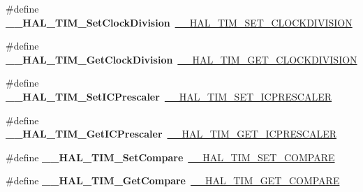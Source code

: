 \begin{DoxyCompactItemize}
\item 
\#define {\bfseries \+\_\+\+\_\+\+H\+A\+L\+\_\+\+T\+I\+M\+\_\+\+Set\+Clock\+Division}~\hyperlink{group___t_i_m___exported___macros_ga8aa84d77c670890408092630f9b2bdc4}{\+\_\+\+\_\+\+H\+A\+L\+\_\+\+T\+I\+M\+\_\+\+S\+E\+T\+\_\+\+C\+L\+O\+C\+K\+D\+I\+V\+I\+S\+I\+ON}\hypertarget{group___h_a_l___t_i_m___aliased___macros_ga8b8f3cf144c4058ec55e6e3659c6a68f}{}\label{group___h_a_l___t_i_m___aliased___macros_ga8b8f3cf144c4058ec55e6e3659c6a68f}

\item 
\#define {\bfseries \+\_\+\+\_\+\+H\+A\+L\+\_\+\+T\+I\+M\+\_\+\+Get\+Clock\+Division}~\hyperlink{group___t_i_m___exported___macros_gae6bc91bb5940bce52828c690f24001b8}{\+\_\+\+\_\+\+H\+A\+L\+\_\+\+T\+I\+M\+\_\+\+G\+E\+T\+\_\+\+C\+L\+O\+C\+K\+D\+I\+V\+I\+S\+I\+ON}\hypertarget{group___h_a_l___t_i_m___aliased___macros_gaaf835e3864f2ba2e2026d417ad0d5e40}{}\label{group___h_a_l___t_i_m___aliased___macros_gaaf835e3864f2ba2e2026d417ad0d5e40}

\item 
\#define {\bfseries \+\_\+\+\_\+\+H\+A\+L\+\_\+\+T\+I\+M\+\_\+\+Set\+I\+C\+Prescaler}~\hyperlink{group___t_i_m___exported___macros_gaeb106399b95ef02cec502f58276a0e92}{\+\_\+\+\_\+\+H\+A\+L\+\_\+\+T\+I\+M\+\_\+\+S\+E\+T\+\_\+\+I\+C\+P\+R\+E\+S\+C\+A\+L\+ER}\hypertarget{group___h_a_l___t_i_m___aliased___macros_ga1cb3c9854441539ebe076fba62c36d22}{}\label{group___h_a_l___t_i_m___aliased___macros_ga1cb3c9854441539ebe076fba62c36d22}

\item 
\#define {\bfseries \+\_\+\+\_\+\+H\+A\+L\+\_\+\+T\+I\+M\+\_\+\+Get\+I\+C\+Prescaler}~\hyperlink{group___t_i_m___exported___macros_gabfeec6b3c67a5747c7dbd20aff61d8e2}{\+\_\+\+\_\+\+H\+A\+L\+\_\+\+T\+I\+M\+\_\+\+G\+E\+T\+\_\+\+I\+C\+P\+R\+E\+S\+C\+A\+L\+ER}\hypertarget{group___h_a_l___t_i_m___aliased___macros_gae8d82e4e04e81f7a023a45b73c9705b7}{}\label{group___h_a_l___t_i_m___aliased___macros_gae8d82e4e04e81f7a023a45b73c9705b7}

\item 
\#define {\bfseries \+\_\+\+\_\+\+H\+A\+L\+\_\+\+T\+I\+M\+\_\+\+Set\+Compare}~\hyperlink{group___t_i_m___exported___macros_ga300d0c9624c3b072d3afeb7cef639b66}{\+\_\+\+\_\+\+H\+A\+L\+\_\+\+T\+I\+M\+\_\+\+S\+E\+T\+\_\+\+C\+O\+M\+P\+A\+RE}\hypertarget{group___h_a_l___t_i_m___aliased___macros_ga03feb77e8c86f3563d671c1ec2439e76}{}\label{group___h_a_l___t_i_m___aliased___macros_ga03feb77e8c86f3563d671c1ec2439e76}

\item 
\#define {\bfseries \+\_\+\+\_\+\+H\+A\+L\+\_\+\+T\+I\+M\+\_\+\+Get\+Compare}~\hyperlink{group___t_i_m___exported___macros_gaa40722f56910966e1da5241b610eed84}{\+\_\+\+\_\+\+H\+A\+L\+\_\+\+T\+I\+M\+\_\+\+G\+E\+T\+\_\+\+C\+O\+M\+P\+A\+RE}\hypertarget{group___h_a_l___t_i_m___aliased___macros_ga6c5f81acbdba730e0cd6a67f06e97de2}{}\label{group___h_a_l___t_i_m___aliased___macros_ga6c5f81acbdba730e0cd6a67f06e97de2}


\end{DoxyCompactItemize}

